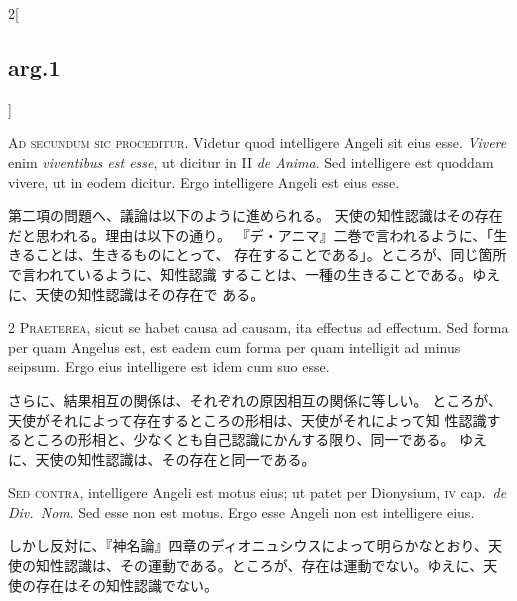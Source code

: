 \documentclass[paper=a4paper,fontsize=10pt,jafontsize=9pt,titlepage]{jlreq}
\begin{document}
\begin{paracol}{2}[\subsection{arg.1}]

{\huge A}{\scshape d secundum sic proceditur}. Videtur quod intelligere
Angeli sit eius esse. {\itshape Vivere} enim {\itshape viventibus est
esse}, ut dicitur in II {\itshape de Anima}. Sed intelligere est quoddam
vivere, ut in eodem dicitur. Ergo intelligere Angeli est eius esse.

\switchcolumn

第二項の問題へ、議論は以下のように進められる。
天使の知性認識はその存在だと思われる。理由は以下の通り。
『デ・アニマ』二巻で言われるように、「生きることは、生きるものにとって、
 存在することである」。ところが、同じ箇所で言われているように、知性認識
 することは、一種の生きることである。ゆえに、天使の知性認識はその存在で
 ある。


{\scshape 2 Praeterea}, sicut se habet causa ad causam,
ita effectus ad effectum. Sed forma per quam Angelus est, est eadem cum
forma per quam intelligit ad minus seipsum. Ergo eius intelligere est
idem cum suo esse.

\switchcolumn

さらに、結果相互の関係は、それぞれの原因相互の関係に等しい。
ところが、天使がそれによって存在するところの形相は、天使がそれによって知
 性認識するところの形相と、少なくとも自己認識にかんする限り、同一である。
 ゆえに、天使の知性認識は、その存在と同一である。

\switchcolumn*[\subsection{s.c.}]

{\scshape Sed contra}, intelligere Angeli est motus eius; ut patet per
Dionysium, {\scshape iv} cap.~{\itshape de Div.~Nom}. Sed esse non est
motus. Ergo esse Angeli non est intelligere eius.

\switchcolumn

しかし反対に、『神名論』四章のディオニュシウスによって明らかなとおり、天
 使の知性認識は、その運動である。ところが、存在は運動でない。ゆえに、天
 使の存在はその知性認識でない。


\end{paracol}
\end{document}
